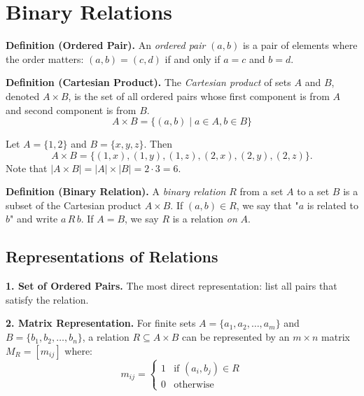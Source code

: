 \documentclass[11pt,a4paper]{article}
\begin{document}
\section{Binary Relations}

\textbf{Definition (Ordered Pair).} An \textit{ordered pair} $(a, b)$ is a pair of elements where the order matters: $(a, b) = (c, d)$ if and only if $a = c$ and $b = d$.

\textbf{Definition (Cartesian Product).} The \textit{Cartesian product} of sets $A$ and $B$, denoted $A \times B$, is the set of all ordered pairs whose first component is from $A$ and second component is from $B$.
\begin{equation*}
    A \times B = \{(a, b) \mid a \in A, b \in B\}
\end{equation*}

\begin{example}
Let $A = \{1, 2\}$ and $B = \{x, y, z\}$. Then
\begin{equation*}
    A \times B = \{(1,x), (1,y), (1,z), (2,x), (2,y), (2,z)\}.
\end{equation*}
Note that $|A \times B| = |A| \times |B| = 2 \cdot 3 = 6$.
\end{example}

\textbf{Definition (Binary Relation).} A \textit{binary relation} $R$ from a set $A$ to a set $B$ is a subset of the Cartesian product $A \times B$. If $(a, b) \in R$, we say that "$a$ is related to $b$" and write $a \, R \, b$. If $A = B$, we say $R$ is a relation \textit{on} $A$.

\subsection{Representations of Relations}

\textbf{1. Set of Ordered Pairs.} The most direct representation: list all pairs that satisfy the relation.

\textbf{2. Matrix Representation.} For finite sets $A = \{a_1, a_2, \dots, a_m\}$ and $B = \{b_1, b_2, \dots, b_n\}$, a relation $R \subseteq A \times B$ can be represented by an $m \times n$ matrix $M_R = [m_{ij}]$ where:
\begin{equation*}
    m_{ij} = \begin{cases}
        1 & \text{if } (a_i, b_j) \in R \\
        0 & \text{otherwise}
    \end{cases}
\end{equation*}
\end{document}
